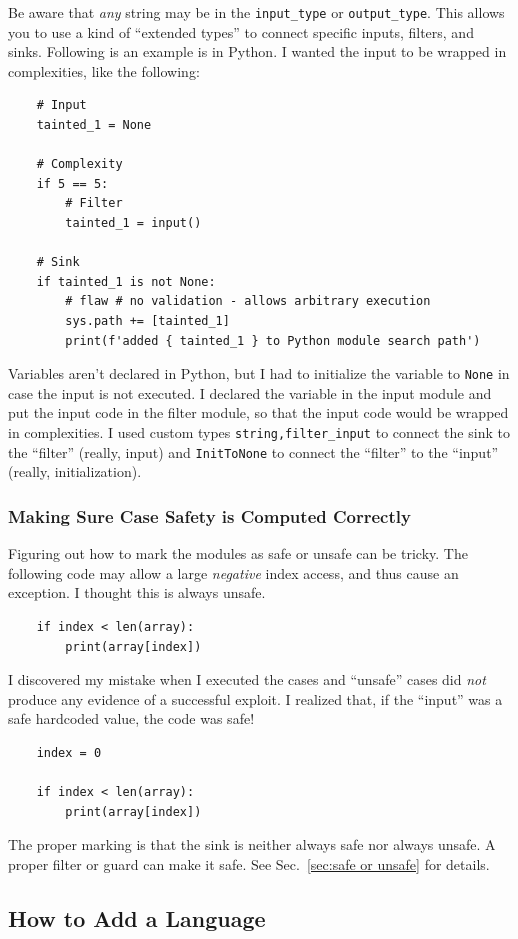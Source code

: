 Be aware that \emph{any} string may be in the \verb|input_type| or
\verb|output_type|.
This allows you to use a kind of ``extended types'' to connect specific inputs,
filters, and sinks.  Following is an example is in Python.
I wanted the input to be wrapped in
complexities, like the following:
\begin{verbatim}
    # Input
    tainted_1 = None

    # Complexity
    if 5 == 5:
        # Filter
        tainted_1 = input()

    # Sink
    if tainted_1 is not None:
        # flaw # no validation - allows arbitrary execution
        sys.path += [tainted_1]
        print(f'added { tainted_1 } to Python module search path')
\end{verbatim}
Variables aren't declared in Python, but I had to initialize the variable to
\verb|None| in case the input is not executed.  I declared the variable in the input
module and put the input code in the filter module, so that the input code would be
wrapped in complexities.  I used custom types \verb|string,filter_input| to connect
the sink to the ``filter'' (really, input) and \verb|InitToNone| to connect the
``filter'' to the ``input'' (really, initialization).

\subsubsection{Making Sure Case Safety is Computed Correctly}

Figuring out how to mark the modules as safe or unsafe can be tricky.
The following code may allow a large \emph{negative} index access, and thus cause an
exception.  I thought this is always unsafe.
\begin{verbatim}
    if index < len(array):
        print(array[index])
\end{verbatim}
I discovered my mistake when I executed the cases and ``unsafe'' cases did
\emph{not} produce any evidence of a successful exploit.  I realized that, if the
``input'' was a safe hardcoded
value, the code was safe!
\begin{verbatim}
    index = 0

    if index < len(array):
        print(array[index])
\end{verbatim}
The proper marking is that the sink is neither always safe nor always unsafe.
A proper filter or guard can make it safe.
See Sec.~\ref{sec:safe or unsafe} for details.


\subsection{How to Add a Language}
\label{sec:add a language}


